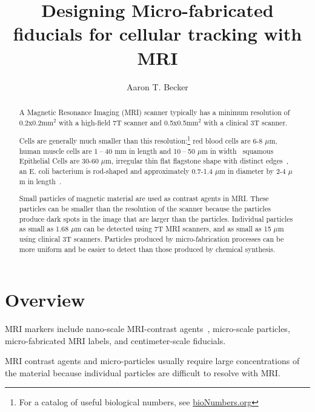 \documentclass[letterpaper, 10 pt, conference]{ieeeconf}
\begin{document}
\author{Aaron T. Becker}
\title{Designing Micro-fabricated fiducials for cellular tracking with MRI}
\maketitle

\begin{abstract}
A Magnetic Resonance Imaging (MRI) scanner typically has a minimum resolution of 0.2x0.2mm$^2$ with a high-field 7T scanner and 0.5x0.5mm$^2$ with a clinical 3T scanner\cite{olamaei2011accurate}.

Cells are generally much smaller than this resolution:\footnote{For a catalog of useful biological numbers, see \url{bioNumbers.org}}
red blood cells are 6-8 $\mu$m, 
human muscle cells are 1 – 40 mm in length and 10 – 50 $\mu$m in width~\cite{lodish2000muscle}
squamous Epithelial Cells are 30-60 $\mu$m, irregular thin flat flagstone shape with distinct edges~\cite{brunzel2004fundamentals}, %
an E. coli bacterium is rod-shaped and approximately 0.7-1.4 $\mu$m in diameter by 2-4 $\mu$m in length~\cite{zaritsky1978chromosome}.

Small particles of magnetic material are used as contrast agents in MRI. 
These particles can be smaller than the resolution of the scanner because the particles produce dark spots in the image that are larger than the particles.  Individual particles as small as 1.68 $\mu$m can be detected using 7T MRI scanners, and as small as 15 $\mu$m using clinical 3T scanners. Particles produced by micro-fabrication processes can be more uniform and be easier to detect than those produced by chemical synthesis.



\end{abstract}

\section{Overview}

MRI markers include nano-scale MRI-contrast agents~\cite{carroll2010experimental}, micro-scale particles, micro-fabricated MRI labels, and centimeter-scale fiducials. 

MRI contrast agents and micro-particles usually require large concentrations of the material because individual particles are difficult to resolve with MRI.
\end{document}

